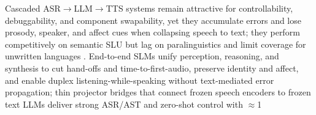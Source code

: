 \documentclass{article}
\begin{document}
Cascaded ASR$\rightarrow$LLM$\rightarrow$TTS systems remain attractive for controllability, debuggability, and component swapability, yet they accumulate errors and lose prosody, speaker, and affect cues when collapsing speech to text; they perform competitively on semantic SLU but lag on paralinguistics and limit coverage for unwritten languages \cite{huang2023holisticcascadesystembenchmarkhumanevalu,huang2025dynamicsuperbphase2collaborativelyexpand}. End-to-end SLMs unify perception, reasoning, and synthesis to cut hand-offs and time-to-first-audio, preserve identity and affect, and enable duplex listening-while-speaking without text-mediated error propagation; thin projector bridges that connect frozen speech encoders to frozen text LLMs deliver strong ASR/AST and zero-shot control with $\approx$1%
\end{document}
